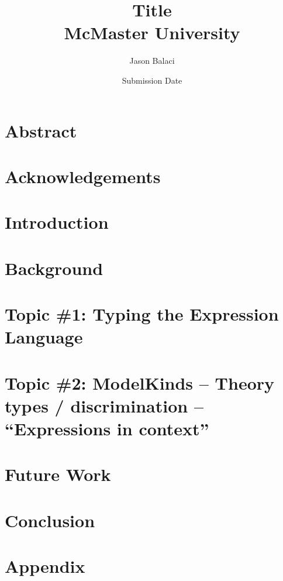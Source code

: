 \documentclass[12pt]{report}
\title{
    {Title}\\
    {McMaster University}
}
\author{Jason Balaci}
\date{Submission Date}
\begin{document}
    \maketitle

    \chapter*{Abstract}
    

    \chapter*{Acknowledgements}
    

    \tableofcontents

    \chapter{Introduction}
    

    \chapter{Background}
    
    
    \chapter{Topic \#1: Typing the Expression Language}
    
    
    \chapter{Topic \#2: ModelKinds -- Theory types / discrimination -- ``Expressions in context''}
    


    \chapter{Future Work}
    
    
    \chapter{Conclusion}
    

    \appendix
    \chapter{Appendix}
    

\end{document}

